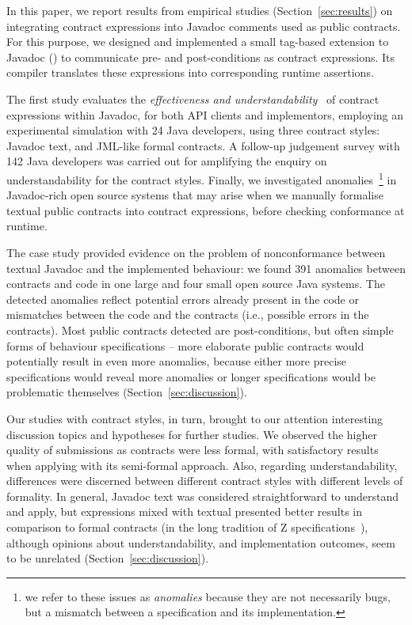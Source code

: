 In this paper, we report results from empirical studies (Section~\ref{sec:results}) on integrating contract expressions into Javadoc comments used as public contracts. 
For this purpose, we designed and implemented a small tag-based extension to Javadoc (\contractjdoc{}) to communicate pre- and post-conditions as contract expressions.
Its compiler translates these expressions into corresponding runtime assertions.

The first study evaluates the \emph{effectiveness and understandability}~\cite{Scalabrino2017} of contract expressions within Javadoc, for both API clients and implementors, employing an experimental simulation with 24 Java developers, using three contract styles: Javadoc text, \contractjdoc{} and JML-like formal contracts. 
A follow-up judgement survey with 142 Java developers was carried out for amplifying the enquiry on understandability for the contract styles. Finally, we investigated anomalies~\footnote{we refer to these issues as \emph{anomalies} because they are not necessarily bugs, but a mismatch between a specification and its implementation.} in Javadoc-rich open source systems that may arise when we manually formalise textual public contracts into contract expressions, before checking conformance at runtime.

The case study provided evidence on the problem of nonconformance between textual Javadoc and the implemented behaviour: we found 391 anomalies between contracts and code in one large and four small open source Java systems. 
The detected anomalies reflect potential errors already present in the code or mismatches between the code and the contracts (i.e., possible errors in the contracts).
Most public contracts detected are post-conditions, but often simple forms of behaviour specifications -- more elaborate public contracts would potentially result in even more anomalies, because either more precise specifications would reveal more anomalies or longer specifications would be problematic themselves (Section~\ref{sec:discussion}).

Our studies with contract styles, in turn, brought to our attention interesting discussion topics and hypotheses for further studies. 
We observed the higher quality of submissions as contracts were less formal, with satisfactory results when applying \contractjdoc{} with its semi-formal approach. Also, regarding understandability, differences were discerned between different contract styles with different levels of formality.
In general, Javadoc text was considered straightforward to understand and apply, but \contractjdoc{} expressions mixed with textual presented better results in comparison to formal contracts (in the long tradition of Z specifications~\cite{zed}), although opinions about understandability, and implementation outcomes, seem to be unrelated (Section~\ref{sec:discussion}).


